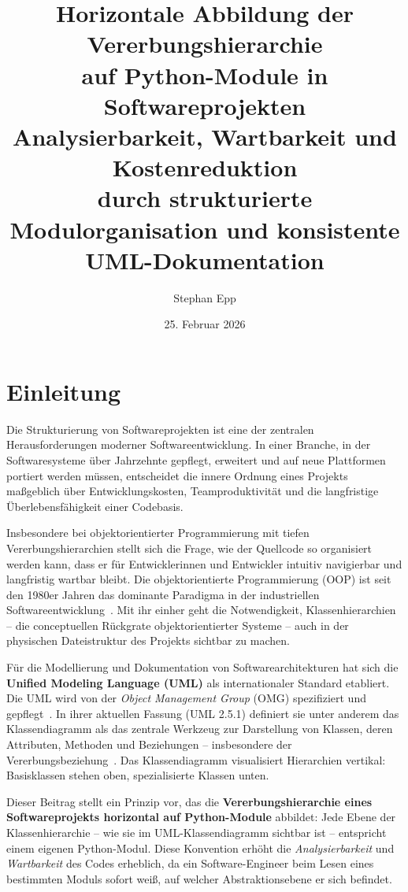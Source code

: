 ﻿\documentclass[a4paper,12pt]{article}
\title{
	\vspace{-1cm}
	\Large\textbf{Horizontale Abbildung der Vererbungshierarchie\\
		auf Python-Module in Softwareprojekten}\\[0.5em]
	\large Analysierbarkeit, Wartbarkeit und Kostenreduktion\\
	durch strukturierte Modulorganisation und konsistente UML-Dokumentation
}
\author{Stephan Epp}
\date{25. Februar 2026}
\begin{document}
	
\maketitle
\tableofcontents
\newpage

\section{Einleitung}

Die Strukturierung von Softwareprojekten ist eine der zentralen Herausforderungen
moderner Softwareentwicklung. In einer Branche, in der Softwaresysteme über
Jahrzehnte gepflegt, erweitert und auf neue Plattformen portiert werden müssen,
entscheidet die innere Ordnung eines Projekts maßgeblich über Entwicklungskosten,
Teamproduktivität und die langfristige Überlebensfähigkeit einer Codebasis.

Insbesondere bei objektorientierter Programmierung mit tiefen Vererbungshierarchien
stellt sich die Frage, wie der Quellcode so organisiert werden kann, dass er für
Entwicklerinnen und Entwickler intuitiv navigierbar und langfristig wartbar bleibt.
Die objektorientierte Programmierung (OOP) ist seit den 1980er Jahren das dominante
Paradigma in der industriellen Softwareentwicklung~\cite{booch1994}. Mit ihr einher
geht die Notwendigkeit, Klassenhierarchien -- die conceptuellen Rückgrate
objektorientierter Systeme -- auch in der physischen Dateistruktur des Projekts
sichtbar zu machen.

Für die Modellierung und Dokumentation von Softwarearchitekturen hat sich die
\textbf{Unified Modeling Language (UML)} als internationaler Standard etabliert.
Die UML wird von der \textit{Object Management Group} (OMG) spezifiziert und
gepflegt~\cite{omg2017}. In ihrer aktuellen Fassung (UML 2.5.1) definiert sie unter
anderem das Klassendiagramm als das zentrale Werkzeug zur Darstellung von Klassen,
deren Attributen, Methoden und Beziehungen -- insbesondere der
Vererbungsbeziehung~\cite{omg2017}. Das Klassendiagramm visualisiert Hierarchien
vertikal: Basisklassen stehen oben, spezialisierte Klassen unten.

Dieser Beitrag stellt ein Prinzip vor, das die \textbf{Vererbungshierarchie eines
	Softwareprojekts horizontal auf Python-Module} abbildet: Jede Ebene der
Klassenhierarchie -- wie sie im UML-Klassendiagramm sichtbar ist -- entspricht
einem eigenen Python-Modul. Diese Konvention erhöht die
\textit{Analysierbarkeit} und \textit{Wartbarkeit} des Codes erheblich, da ein
Software-Engineer beim Lesen eines bestimmten Moduls sofort weiß, auf welcher
Abstraktionsebene er sich befindet.
\end{document}
